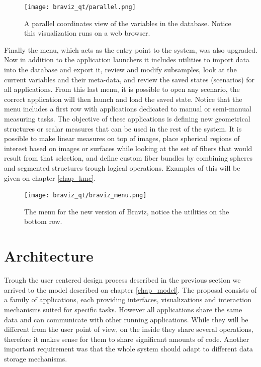 \begin{figure}
\centering
\texttt{[image: braviz\_qt/parallel.png]} 
\caption{\label{fig_parallel_2}A parallel coordinates view of the variables in the database. Notice this visualization runs on a web browser.}
\end{figure}

Finally the menu, which acts as the entry point to the system, was also upgraded. Now in addition to the application launchers it includes utilities to import data into the database and export it, review and modify subsamples, look at the current variables and their meta-data, and review the saved states (scenarios) for all applications. From this last menu, it is possible to open any scenario, the correct application will then launch and load the saved state. Notice that the menu includes a first row with applications dedicated to manual or semi-manual measuring tasks. The objective of these applications is defining new geometrical structures or scalar measures that can be used in the rest of the system. It is possible to make linear measures on top of images, place spherical regions of interest based on images or surfaces while looking at the set of fibers that would result from that selection, and define custom fiber bundles by combining spheres and segmented structures trough logical operations. Examples of this will be given on chapter \ref{chap_kmc}.

\begin{figure}
\centering
\texttt{[image: braviz\_qt/braviz\_menu.png]} 
\caption{\label{fig_menu_2}The menu for the new version of Braviz, notice the utilities on the bottom row.}
\end{figure}



\section{Architecture}
\label{sec_arch}

%


Trough the user centered design process described in the previous section we arrived to the model described on chapter \ref{chap_model}. The proposal consists of a family of applications, each providing interfaces, visualizations and interaction mechanisms suited for specific tasks. However all applications share the same data and can communicate with other running applications. While they will be different from the user point of view, on the inside they share several operations, therefore it makes sense for them to share significant amounts of code. Another important requirement was that the whole system should adapt to different data storage mechanisms. 

